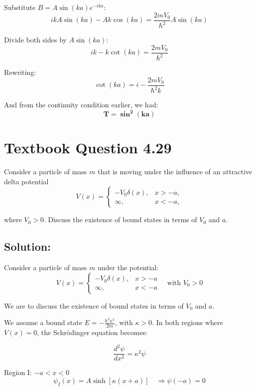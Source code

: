 \documentclass[12pt]{article}
\begin{document}
        Substitute \( B = A \sin(ka) e^{-ika} \):
        \[
            i k A \sin(ka) - A k \cos(ka) = \frac{2m V_0}{\hbar^2} A \sin(ka)
        \]

        Divide both sides by \( A \sin(ka) \):
        \[
            i k - k \cot(ka) = \frac{2m V_0}{\hbar^2}
        \]      

        Rewriting:
        \[
            \cot(ka) = i - \frac{2m V_0}{\hbar^2 k}
        \]

        And from the continuity condition earlier, we had:
        \[
            \boldsymbol{\boxed{T = \sin^2(ka)}}
        \]

\section{Textbook Question 4.29}
    Consider a particle of mass \( m \) that is moving under the influence of an attractive delta potential
    \[
        V(x) =
        \begin{cases}
        - V_0 \delta(x), & x > -a, \\
        \infty, & x < -a,
        \end{cases}
    \]
    
    where \( V_0 > 0 \). Discuss the existence of bound states in terms of \( V_0 \) and \( a \).

    \subsection{Solution:}
        Consider a particle of mass \( m \) under the potential:
        \[
            V(x) =
            \begin{cases}
            - V_0 \delta(x), & x > -a \\
            \infty, & x < -a
            \end{cases}
            \quad \text{with } V_0 > 0
        \]
        
        We are to discuss the existence of bound states in terms of \( V_0 \) and \( a \).
    
        We assume a bound state \( E = -\frac{\hbar^2 \kappa^2}{2m} \), with \( \kappa > 0 \). In both regions where \( V(x) = 0 \), the Schrödinger equation becomes:
        
        \[
            \frac{d^2 \psi}{dx^2} = \kappa^2 \psi
        \]
        
        Region I: \( -a < x < 0 \)
        \[
            \psi_I(x) = A \sinh[\kappa(x + a)]
            \quad \Rightarrow \psi(-a) = 0
        \]
        
\end{document}
